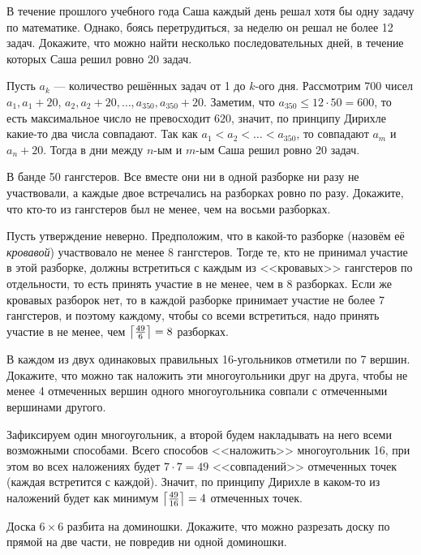 \documentclass[12pt,a4paper]{article}
\begin{document}
 В течение прошлого учебного года Саша каждый день решал хотя бы одну задачу по математике. Однако, боясь перетрудиться, за неделю он решал не более 12 задач. Докажите, что можно найти несколько последовательных дней, в течение которых Саша решил ровно 20 задач.

 Пусть $a_k$ --- количество решённых задач от 1 до $k$-ого дня. Рассмотрим 700 чисел  $a_1,a_1+20$, $a_2,a_2+20, \ldots, a_{350},a_{350}+20$. Заметим, что $a_{350} \leq 12 \cdot 50 = 600$, то есть максимальное число не превосходит $620$, значит,  по принципу Дирихле какие-то два числа совпадают. Так как $a_1 < a_2 < \ldots < a_{350}$, то совпадают $a_m$ и $a_n+20$. Тогда в дни между $n$-ым и $m$-ым Саша решил ровно 20 задач.

 В банде 50 гангстеров. Все вместе они ни в одной разборке ни разу не участвовали, а каждые двое встречались на разборках ровно по разу. Докажите, что кто-то из гангстеров был не менее, чем на восьми разборках.

 Пусть утверждение неверно. Предположим, что в какой-то разборке (назовём её {\it кровавой}) участвовало не менее 8 гангстеров. Тогде те, кто не принимал участие в этой разборке, должны встретиться с каждым из <<кровавых>> гангстеров по отдельности, то есть принять участие в не менее, чем в 8 разборках. Если же кровавых разборок нет, то в каждой разборке принимает участие не более 7 гангстеров, и поэтому каждому, чтобы со всеми встретиться, надо принять участие в не менее, чем $\left\lceil\frac{49}{6}\right\rceil = 8$ разборках.


 В каждом из двух одинаковых правильных 16-угольников отметили по 7 вершин. Докажите, что можно так наложить эти многоугольники друг на друга, чтобы не менее 4 отмеченных вершин одного многоугольника совпали с отмеченными вершинами другого.

 Зафиксируем один многоугольник, а второй будем накладывать на него всеми возможными способами. Всего способов <<наложить>> многоугольник 16, при
этом во всех наложениях будет  $7\cdot 7=49$ <<совпадений>> отмеченных точек (каждая встретится с каждой). Значит, по принципу Дирихле в каком-то из наложений будет как минимум $\left\lceil\frac{49}{16}\right\rceil=4$ отмеченных точек.


Доска $6\times6$ разбита на доминошки. Докажите, что можно разрезать доску по прямой на две части, не повредив ни одной доминошки.
\end{document}
